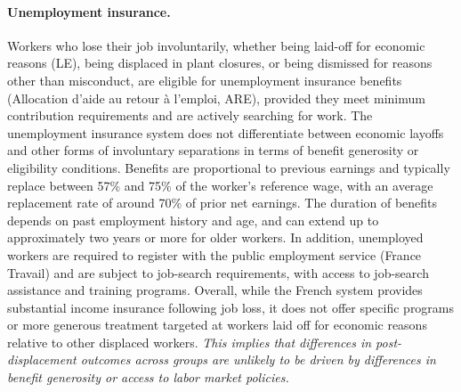 \paragraph{Unemployment insurance.} %
Workers who lose their job involuntarily, whether being laid-off for economic reasons (LE), being displaced in plant closures, or being dismissed for reasons other than misconduct, are eligible for unemployment insurance benefits (Allocation d’aide au retour à l’emploi, ARE), provided they meet minimum contribution requirements and are actively searching for work. The unemployment insurance system does not differentiate between economic layoffs and other forms of involuntary separations in terms of benefit generosity or eligibility conditions. Benefits are proportional to previous earnings and typically replace between 57\% and 75\% of the worker’s reference wage, with an average replacement rate of around 70\% of prior net earnings. The duration of benefits depends on past employment history and age, and can extend up to approximately two years or more for older workers. In addition, unemployed workers are required to register with the public employment service (France Travail) and are subject to job-search requirements, with access to job-search assistance and training programs. Overall, while the French system provides substantial income insurance following job loss, it does not offer specific programs or more generous treatment targeted at workers laid off for economic reasons relative to other displaced workers. \textit{This implies that differences in post-displacement outcomes across groups are unlikely to be driven by differences in benefit generosity or access to labor market policies.}
